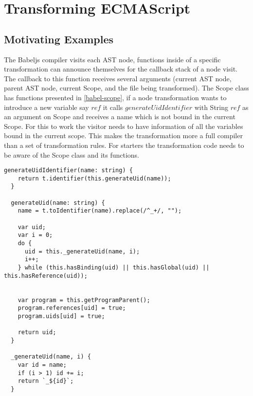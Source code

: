 
\chapter{Transforming ECMAScript} %

\label{Chapter3}


\section{Motivating Examples}

The Babeljs compiler visits each AST node, functions inside of a specific transformation can announce themselves for the callback stack of a node visit. The callback to this function receives several arguments (current AST node, parent AST node, current Scope, and the file being transformed). The Scope class has functions presented in \ref{babel-scope}, if a node transformation wants to introduce a new variable say $ref$ it calls $generateUidIdentifier$ with String $ref$ as an argument on Scope and receives a name which is not bound in the current Scope. For this to work the visitor needs to have information of all the variables bound in the current scope. This makes the transformation more a full compiler than a set of transformation rules. For starters the transformation code needs to be aware of the Scope class and its functions. 

\begin{lstlisting}[label=babel-scope, caption={Variable capture avoidance code from babeljs source\protect\footnotemark}]
  generateUidIdentifier(name: string) {
    return t.identifier(this.generateUid(name));
  }

  generateUid(name: string) {
    name = t.toIdentifier(name).replace(/^_+/, "");

    var uid;
    var i = 0;
    do {
      uid = this._generateUid(name, i);
      i++;
    } while (this.hasBinding(uid) || this.hasGlobal(uid) || this.hasReference(uid));


    var program = this.getProgramParent();
    program.references[uid] = true;
    program.uids[uid] = true;

    return uid;
  }

  _generateUid(name, i) {
    var id = name;
    if (i > 1) id += i;
    return `_${id}`;
  }
\end{lstlisting}

